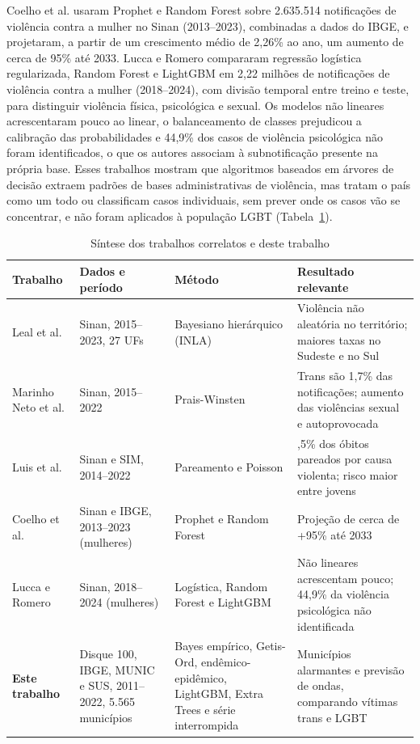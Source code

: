 \documentclass[12pt]{article}
\begin{document}
Coelho et al. \cite{coelho_jiv:2025} usaram Prophet e Random Forest sobre 2.635.514 notificações de violência contra a mulher no Sinan (2013--2023), combinadas a dados do IBGE, e projetaram, a partir de um crescimento médio de 2,26\% ao ano, um aumento de cerca de 95\% até 2033. Lucca e Romero \cite{lucca_romero_sbbd:2026} compararam regressão logística regularizada, Random Forest e LightGBM em 2,22 milhões de notificações de violência contra a mulher (2018--2024), com divisão temporal entre treino e teste, para distinguir violência física, psicológica e sexual. Os modelos não lineares acrescentaram pouco ao linear, o balanceamento de classes prejudicou a calibração das probabilidades e 44,9\% dos casos de violência psicológica não foram identificados, o que os autores associam à subnotificação presente na própria base. Esses trabalhos mostram que algoritmos baseados em árvores de decisão extraem padrões de bases administrativas de violência, mas tratam o país como um todo ou classificam casos individuais, sem prever onde os casos vão se concentrar, e não foram aplicados à população LGBT (Tabela~\ref{tab:referencia}).

\begin{table}[!htb]
\centering
\caption{Síntese dos trabalhos correlatos e deste trabalho}
\label{tab:referencia}
{\renewcommand{\arraystretch}{1.15}\footnotesize
\begin{tabular}{>{\raggedright\arraybackslash}p{2.5cm} >{\raggedright\arraybackslash}p{3.1cm} >{\raggedright\arraybackslash}p{3.2cm} >{\raggedright\arraybackslash}p{4.4cm}}
\toprule
\textbf{Trabalho} & \textbf{Dados e período} & \textbf{Método} & \textbf{Resultado relevante} \\
\midrule
Leal et al. \cite{leal_silva_lizzi:2026} & Sinan, 2015--2023, 27 UFs & Bayesiano hierárquico (INLA) & Violência não aleatória no território; maiores taxas no Sudeste e no Sul \\
\addlinespace
Marinho Neto et al. \cite{marinho_tomazelli_firianelli:2024} & Sinan, 2015--2022 & Prais-Winsten & Trans são 1,7\% das notificações; aumento das violências sexual e autoprovocada \\
\addlinespace
Luis et al. \cite{luis:2025} & Sinan e SIM, 2014--2022 & Pareamento e Poisson & 42,5\% dos óbitos pareados por causa violenta; risco maior entre jovens \\
\addlinespace
Coelho et al. \cite{coelho_jiv:2025} & Sinan e IBGE, 2013--2023 (mulheres) & Prophet e Random Forest & Projeção de cerca de +95\% até 2033 \\
\addlinespace
Lucca e Romero \cite{lucca_romero_sbbd:2026} & Sinan, 2018--2024 (mulheres) & Logística, Random Forest e LightGBM & Não lineares acrescentam pouco; 44,9\% da violência psicológica não identificada \\
\midrule
\textbf{Este trabalho} & Disque 100, IBGE, MUNIC e SUS, 2011--2022, 5.565 municípios & Bayes empírico, Getis-Ord, endêmico-epidêmico, LightGBM, Extra Trees e série interrompida & Municípios alarmantes e previsão de ondas, comparando vítimas trans e LGBT \\
\bottomrule
\end{tabular}}
\end{table}
\end{document}
